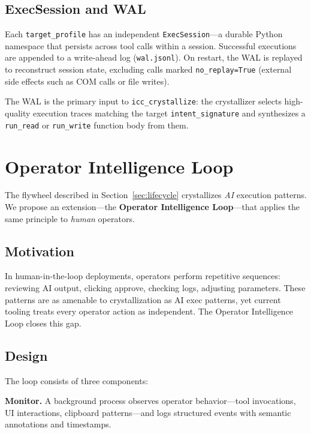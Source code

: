 \documentclass[11pt,a4paper]{article}
\begin{document}
\subsection{ExecSession and WAL}

Each \texttt{target\_profile} has an independent \texttt{ExecSession}---a durable Python namespace that
persists across tool calls within a session.
Successful executions are appended to a write-ahead log (\texttt{wal.jsonl}).
On restart, the WAL is replayed to reconstruct session state, excluding calls marked \texttt{no\_replay=True}
(external side effects such as COM calls or file writes).

The WAL is the primary input to \texttt{icc\_crystallize}: the crystallizer selects high-quality execution
traces matching the target \texttt{intent\_signature} and synthesizes a \texttt{run\_read} or
\texttt{run\_write} function body from them.

\section{Operator Intelligence Loop}

The flywheel described in Section~\ref{sec:lifecycle} crystallizes \emph{AI} execution patterns.
We propose an extension---the \textbf{Operator Intelligence Loop}---that applies the same principle to
\emph{human} operators.

\subsection{Motivation}

In human-in-the-loop deployments, operators perform repetitive sequences: reviewing AI output, clicking
approve, checking logs, adjusting parameters.
These patterns are as amenable to crystallization as AI exec patterns, yet current tooling treats every
operator action as independent.
The Operator Intelligence Loop closes this gap.

\subsection{Design}

The loop consists of three components:

\textbf{Monitor.}
A background process observes operator behavior---tool invocations, UI interactions, clipboard patterns---and
logs structured events with semantic annotations and timestamps.
\end{document}
